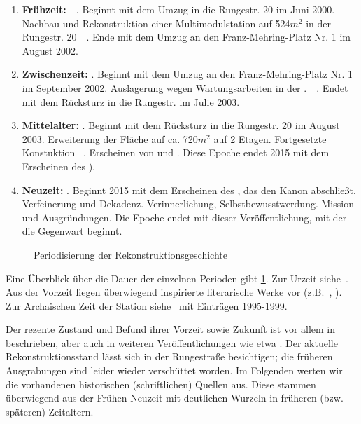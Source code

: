 \begin{enumerate}
        \item \textbf{Frühzeit:} - . Beginnt mit dem Umzug in die Rungestr. 20 im Juni 2000.  Nachbau und Rekonstruktion einer Multimodulstation  auf 524$m^2$ in der Rungestr. 20~\cite{cbasepressemap}~\cite{cbasebook}. Ende mit dem Umzug an den Franz-Mehring-Platz Nr. 1 im August 2002.
        
        \item \textbf{Zwischenzeit:} .  Beginnt mit dem Umzug an den Franz-Mehring-Platz Nr. 1 im September 2002. 
        Auslagerung wegen Wartungsarbeiten in der .~\cite{cbasepressemap}~\cite{cbasebook}.  Endet mit dem Rücksturz in die Rungestr. im Julie 2003.
        
        \item \textbf{Mittelalter:}  . Beginnt mit dem Rücksturz in die Rungestr. 20 im August 2003. 
         Erweiterung der Fläche auf ca. 720$m^2$ auf 2 Etagen. Fortgesetzte Konstuktion \cite{cbasepressemap}~\cite{cbasebook}. Erscheinen von \cite{cbasestarbasemanual} und \cite{ctour}. Diese Epoche endet 2015 mit dem Erscheinen des ).
        
         \item \textbf{Neuzeit:} . Beginnt 2015 mit dem Erscheinen des , das den Kanon abschließt. Verfeinerung und Dekadenz. Verinnerlichung, Selbstbewusstwerdung. Mission und Ausgründungen. Die Epoche endet mit dieser Veröffentlichung, mit der die Gegenwart beginnt.
    \end{enumerate}


\begin{figure}
    \centering
        
        \vspace{2ex}
    \caption{Periodisierung der Rekonstruktionsgeschichte}
    \label{fig:perioden}
\end{figure}

Eine Überblick über die Dauer der einzelnen Perioden gibt \cref{fig:perioden}. Zur Urzeit siehe~\cite{cbaselogbuchpre}. Aus der Vorzeit liegen überwiegend inspirierte literarische Werke vor (z.B.~\cite{rfc968cerf}, \cite{rfc527cerf}). Zur Archaischen Zeit der Station siehe~\cite{cbaselogbuchnow} mit Einträgen 1995-1999.


Der rezente Zustand und Befund ihrer Vorzeit sowie Zukunft ist vor allem in \cite{cbasebook} beschrieben, aber auch in weiteren Veröffentlichungen wie etwa \cite{cbasewebsite}. Der aktuelle Rekonstruktionsstand lässt sich in der Rungestraße besichtigen; die früheren Ausgrabungen sind leider wieder verschüttet worden. Im Folgenden werten wir die vorhandenen historischen (schriftlichen) Quellen  aus. Diese stammen überwiegend aus der Frühen Neuzeit mit deutlichen Wurzeln in früheren (bzw. späteren) Zeitaltern.

